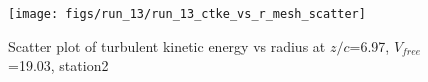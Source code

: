 \begin{figure}[H]
\centering
\texttt{[image: figs/run\_13/run\_13\_ctke\_vs\_r\_mesh\_scatter]}
\caption{Scatter plot of turbulent kinetic energy vs radius at $z/c$=6.97, $V_{free}$=19.03, station2}
\label{fig:run_13_ctke_vs_r_mesh_scatter}
\end{figure}


